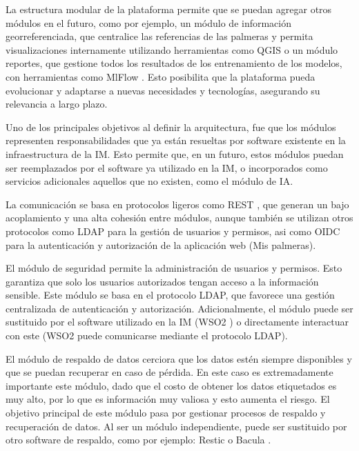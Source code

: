 La estructura modular de la plataforma permite que se puedan agregar otros módulos en el futuro, como por ejemplo, un módulo de información georreferenciada, que centralice las referencias de las palmeras y permita visualizaciones internamente utilizando herramientas como QGIS \citep{wikipedia_qgis_2025} o un módulo reportes, que gestione todos los resultados de los entrenamiento de los modelos, con herramientas como MlFlow \citep{zaharia_accelerating_2018}. Esto posibilita que la plataforma pueda evolucionar y adaptarse a nuevas necesidades y tecnologías, asegurando su relevancia a largo plazo.

Uno de los principales objetivos al definir la arquitectura, fue que los módulos representen responsabilidades que ya están resueltas por software existente en la infraestructura de la IM. Esto permite que, en un futuro, estos módulos puedan ser reemplazados por el software ya utilizado en la IM, o incorporados como servicios adicionales aquellos que no existen, como el módulo de IA.

La comunicación se basa en protocolos ligeros como REST \citep{wikipedia_protocolo_2024}, que generan un bajo acoplamiento y una alta cohesión entre módulos, aunque también se utilizan otros protocolos como LDAP para la gestión de usuarios y permisos, asi como OIDC para la autenticación y autorización de la aplicación web (Mis palmeras).

El módulo de seguridad permite la administración de usuarios y permisos. Esto garantiza que solo los usuarios autorizados tengan acceso a la información sensible. Este módulo se basa en el protocolo LDAP, que favorece una gestión centralizada de autenticación y autorización. Adicionalmente, el módulo puede ser sustituido por el software utilizado en la IM (WSO2 \citep{wso2_deliver_nodate}) o directamente interactuar con este (WSO2 puede comunicarse mediante el protocolo LDAP).

El módulo de respaldo de datos cerciora que los datos estén siempre disponibles y que se puedan recuperar en caso de pérdida. En este caso es extremadamente importante este módulo, dado que el costo de obtener los datos etiquetados es muy alto, por lo que es información muy valiosa y esto aumenta el riesgo. El objetivo principal de este módulo pasa por gestionar procesos de respaldo y recuperación de datos. Al ser un módulo independiente, puede ser sustituido por otro software de respaldo, como por ejemplo: Restic \citep{restic_restic_nodate} o Bacula \citep{bacula_documentation_nodate}.

